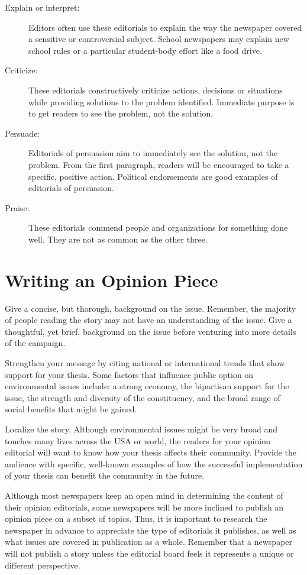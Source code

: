 \begin{description}
	\item[Explain or interpret:] Editors often use these editorials to explain the way the newspaper covered a sensitive or controversial subject. School newspapers may explain new school rules or a particular student-body effort like a food drive.
	\item[Criticize:] These editorials constructively criticize actions, decisions or situations while providing solutions to the problem identified. Immediate purpose is to get readers to see the problem, not the solution.
	\item[Persuade:] Editorials of persuasion aim to immediately see the solution, not the problem. From the first paragraph, readers will be encouraged to take a specific, positive action. Political endorsements are good examples of editorials of persuasion.
	\item[Praise:] These editorials commend people and organizations for something done well. They are not as common as the other three.
\end{description}
 

\section{Writing an Opinion Piece}
Give a concise, but thorough, background on the issue. Remember, the majority of people reading the story may not have an understanding of the issue. Give a thoughtful, yet brief, background on the issue before venturing into more details of the campaign.

Strengthen your message by citing national or international trends that show support for your thesis. Some factors  that influence public option on environmental issues include: a strong economy, the bipartisan support for the issue, the strength and diversity of the constituency, and the broad range of social benefits that might be gained.

Localize the story. Although environmental issues might be very broad and touches many lives across the USA or world, the readers for your opinion editorial will want to know how your thesis affects their community. Provide the audience with specific, well-known examples of how the successful implementation of your thesis can benefit the community in the future.


Although most newspapers keep an open mind in determining the content of their opinion editorials, some newspapers will be more inclined to publish an opinion piece on a subset of topics. Thus, it is important to research the newspaper in advance to appreciate the type of editorials it publishes, as well as what issues are covered in publication as a whole. Remember that a newspaper will not publish a story unless the editorial board feels it represents a unique or different perspective.

